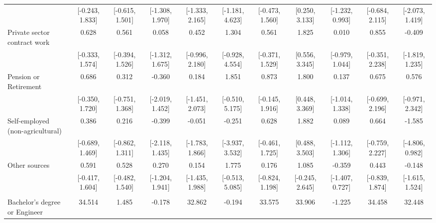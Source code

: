 \documentclass[
  10,
  letterpaper,
  DIV=11,
  numbers=noendperiod]{scrartcl}
\begin{document}
\begin{table}
\begin{tabular}[t]{lcccccccccc}
\hspace{1em} & {}[-0.243, 1.833] & {}[-0.615, 1.501] & {}[-1.308, 1.970] & {}[-1.333, 2.165] & {}[-1.181, 4.623] & {}[-0.473, 1.560] & {}[0.250, 3.133] & {}[-1.232, 0.993] & {}[-0.684, 2.115] & {}[-2.073, 1.419]\\
\hspace{1em}Private sector contract work & 0.628 & 0.561 & 0.058 & 0.452 & 1.304 & 0.561 & 1.825 & 0.010 & 0.855 & -0.409\\
\hspace{1em} & {}[-0.333, 1.574] & {}[-0.394, 1.526] & {}[-1.312, 1.675] & {}[-0.996, 2.180] & {}[-0.928, 4.554] & {}[-0.371, 1.529] & {}[0.556, 3.345] & {}[-0.979, 1.044] & {}[-0.351, 2.238] & {}[-1.819, 1.235]\\
\hspace{1em}Pension or Retirement & 0.686 & 0.312 & -0.360 & 0.184 & 1.851 & 0.873 & 1.800 & 0.137 & 0.675 & 0.576\\
\hspace{1em} & {}[-0.350, 1.720] & {}[-0.751, 1.368] & {}[-2.019, 1.452] & {}[-1.451, 2.073] & {}[-0.510, 5.175] & {}[-0.145, 1.916] & {}[0.448, 3.369] & {}[-1.014, 1.338] & {}[-0.699, 2.196] & {}[-0.971, 2.342]\\
\hspace{1em}Self-employed (non-agricultural) & 0.386 & 0.216 & -0.399 & -0.051 & -0.251 & 0.628 & 1.882 & 0.089 & 0.664 & -1.585\\
\hspace{1em} & {}[-0.689, 1.469] & {}[-0.862, 1.311] & {}[-2.118, 1.435] & {}[-1.783, 1.866] & {}[-3.937, 3.532] & {}[-0.461, 1.725] & {}[0.488, 3.503] & {}[-1.112, 1.306] & {}[-0.759, 2.227] & {}[-4.806, 0.982]\\
\hspace{1em}Other sources & 0.591 & 0.528 & 0.270 & 0.154 & 1.775 & 0.176 & 1.085 & -0.359 & 0.443 & -0.148\\
\hspace{1em} & {}[-0.417, 1.604] & {}[-0.482, 1.540] & {}[-1.204, 1.941] & {}[-1.435, 1.988] & {}[-0.513, 5.085] & {}[-0.824, 1.198] & {}[-0.245, 2.645] & {}[-1.407, 0.727] & {}[-0.839, 1.874] & {}[-1.615, 1.524]\\
\addlinespace[0.3em]
\multicolumn{11}{l}{\cellcolor[HTML]{3498DB}{\textbf{Education}}}\\
\hspace{1em}Bachelor's degree or Engineer & 34.514 & 1.485 & -0.178 & 32.862 & -0.194 & 33.575 & 33.906 & -1.225 & 34.458 & 32.448\\

\end{tabular}
\end{table}
\end{document}

